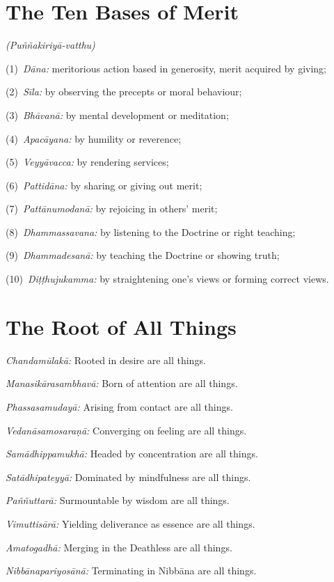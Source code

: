 \ifhandbookedition
\clearpage
\fi

\section*{The Ten Bases of Merit}

\emph{(Puññakiriyā-vatthu)}

(1)~\emph{Dāna:} meritorious action based in generosity, merit acquired by giving;

(2)~\emph{Sīla:} by observing the precepts or moral behaviour;

(3)~\emph{Bhāvanā:} by mental development or meditation;

(4)~\emph{Apacāyana:} by humility or reverence;

(5)~\emph{Veyyāvacca:} by rendering services;

(6)~\emph{Pattidāna:} by sharing or giving out merit;

(7)~\emph{Pattānumodanā:} by rejoicing in others' merit;

(8)~\emph{Dhammassavana:} by listening to the Doctrine or right teaching;

(9)~\emph{Dhammadesanā:} by teaching the Doctrine or showing truth;

(10)~\emph{Diṭṭhujukamma:} by straightening one's views or forming correct views.


\clearpage

\section*{The Root of All Things}

\emph{Chandamūlakā:} Rooted in desire are all things.

\emph{Manasikārasambhavā:} Born of attention are all things.

\emph{Phassasamudayā:} Arising from contact are all things.

\emph{Vedanāsamosaraṇā:} Converging on feeling are all things.

\emph{Samādhippamukhā:} Headed by concentration are all things.

\emph{Satādhipateyyā:} Dominated by mindfulness are all things.

\emph{Paññuttarā:} Surmountable by wisdom are all things.

\emph{Vimuttisārā:} Yielding deliverance as essence are all things.

\emph{Amatogadhā:} Merging in the Deathless are all things.

\emph{Nibbānapariyosānā:} Terminating in Nibbāna are all things.


